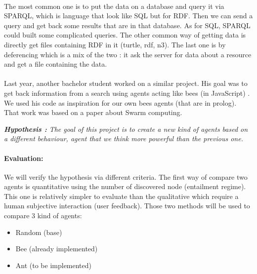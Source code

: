 \documentclass{article}
\newenvironment{itemh}[0]{\begin{itemize}[label=$\heartsuit$, font=\color{mygray} \small]}{\end{itemize}}
\begin{document}
	\paragraph{}	%
		The most common one is to put the data on a database and query it via SPARQL,
		which is language that look like SQL but for RDF.
		Then we can send a query and get back some results that are in that database.
		As for SQL, SPARQL could built some complicated queries.
		The other common way of getting data is directly get files containing RDF in it (turtle, rdf, n3).
		The last one is by deferencing which is a mix of the two :
		it ask the server for data about a resource and get a file containing the data.
	\paragraph{}	%
		Last year, another bachelor student worked on a similar project.
		His goal was to get back information from a search using agents acting like bees (in JavaScript) \cite{Kroes13}.
		We used his code as inspiration for our own bees agents (that are in prolog).
		That work was based on a paper \cite{Gueret10} about Swarm computing.
		\begin{center}
			\textit{
			\textbf{Hypothesis :} The goal of this project is to create a new kind of agents based on a different behaviour,
			agent that we think more powerful than the previous one.}
		\end{center}

		\paragraph{Evaluation:}
			We will verify the hypothesis via different criteria.
			The first way of compare two agents is quantitative using the number of discovered node (entailment regime).
			This one is relatively simpler to evaluate than the qualitative which require a human subjective interaction (user feedback).
			Those two methods will be used to compare 3 kind of agents:
		\begin{itemh}
			\item Random (base)
			\item Bee (already implemented)
			\item Ant (to be implemented)
		\end{itemh}
\end{document}
